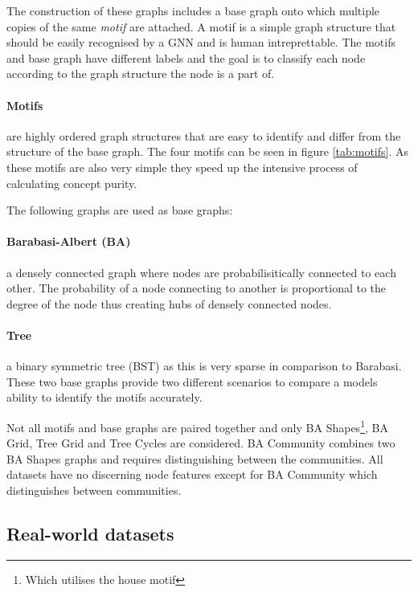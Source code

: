 The construction of these graphs includes a base graph onto which multiple copies of the same \emph{motif} are attached.
A motif is a simple graph structure that should be easily recognised by a GNN and is human intreprettable.
The motifs and base graph have different labels and the goal is to classify each node according to the graph structure the node is a part of.

\paragraph{Motifs}

are highly ordered graph structures that are easy to identify and differ from the structure of the base graph.
The four motifs can be seen in figure \ref{tab:motifs}.
As these motifs are also very simple they speed up the intensive process of calculating concept purity.

The following graphs are used as base graphs:

\paragraph{Barabasi-Albert (BA)}
a densely connected graph where nodes are probabilisitically connected to each other.
The probability of a node connecting to another is proportional to the degree of the node thus creating hubs of densely connected nodes.

\paragraph{Tree}
a binary symmetric tree (BST) as this is very sparse in comparison to Barabasi.
These two base graphs provide two different scenarios to compare a models ability to identify the motifs accurately.

Not all motifs and base graphs are paired together and only BA Shapes\footnote{Which utilises the house motif}, BA Grid, Tree Grid and Tree Cycles are considered.
BA Community combines two BA Shapes graphs and requires distinguishing between the communities.
All datasets have no discerning node features except for BA Community which distinguishes between communities.

\subsection{Real-world datasets}
\label{sec:RWD}

